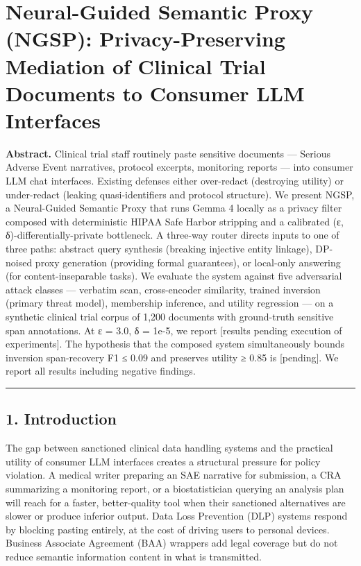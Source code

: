 \section{Neural-Guided Semantic Proxy (NGSP): Privacy-Preserving
Mediation of Clinical Trial Documents to Consumer LLM
Interfaces}\label{neural-guided-semantic-proxy-ngsp-privacy-preserving-mediation-of-clinical-trial-documents-to-consumer-llm-interfaces}

\textbf{Abstract.} Clinical trial staff routinely paste sensitive
documents --- Serious Adverse Event narratives, protocol excerpts,
monitoring reports --- into consumer LLM chat interfaces. Existing
defenses either over-redact (destroying utility) or under-redact
(leaking quasi-identifiers and protocol structure). We present NGSP, a
Neural-Guided Semantic Proxy that runs Gemma 4 locally as a privacy
filter composed with deterministic HIPAA Safe Harbor stripping and a
calibrated (ε, δ)-differentially-private bottleneck. A three-way router
directs inputs to one of three paths: abstract query synthesis (breaking
injective entity linkage), DP-noised proxy generation (providing formal
guarantees), or local-only answering (for content-inseparable tasks). We
evaluate the system against five adversarial attack classes --- verbatim
scan, cross-encoder similarity, trained inversion (primary threat
model), membership inference, and utility regression --- on a synthetic
clinical trial corpus of 1,200 documents with ground-truth sensitive
span annotations. At ε = 3.0, δ = 1e-5, we report {[}results pending
execution of experiments{]}. The hypothesis that the composed system
simultaneously bounds inversion span-recovery F1 ≤ 0.09 and preserves
utility ≥ 0.85 is {[}pending{]}. We report all results including
negative findings.

\begin{center}\rule{0.5\linewidth}{0.5pt}\end{center}

\subsection{1. Introduction}\label{introduction}

The gap between sanctioned clinical data handling systems and the
practical utility of consumer LLM interfaces creates a structural
pressure for policy violation. A medical writer preparing an SAE
narrative for submission, a CRA summarizing a monitoring report, or a
biostatistician querying an analysis plan will reach for a faster,
better-quality tool when their sanctioned alternatives are slower or
produce inferior output. Data Loss Prevention (DLP) systems respond by
blocking pasting entirely, at the cost of driving users to personal
devices. Business Associate Agreement (BAA) wrappers add legal coverage
but do not reduce semantic information content in what is transmitted.

